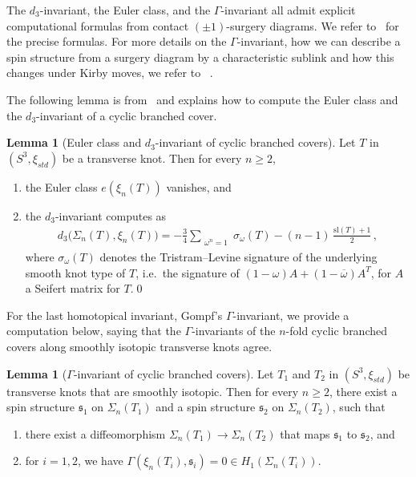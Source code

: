 \documentclass[11pt]{amsart}
\theoremstyle{definition}
\theoremstyle{definition}
\theoremstyle{definition}
\theoremstyle{definition}
\newtheorem{lemma}[theorem]{Lemma}
\begin{document}
The $d_3$-invariant, the Euler class, and the $\Gamma$-invariant all admit explicit computational formulas from contact $(\pm 1)$-surgery diagrams. We refer to~\cite{DingGeigesStipsicz_surgery,Durst_Kegel_rot_surgery,Kegel_thesis,EKS_contact_surgery_numbers} for the precise formulas. For more details on the $\Gamma$-invariant, how we can describe a spin structure from a surgery diagram by a characteristic sublink and how this changes under Kirby moves, we refer to ~\cite{Kaplan,Gompf_Stein,Gompf_Stipsicz,EKS_contact_surgery_numbers,surgery_distance}.

The following lemma is from~\cite{Plamenevskaya_DBC,Harvey_br_covers,Ito_d3} and explains how to compute the Euler class and the $d_3$-invariant of a cyclic branched cover. 

\begin{lemma}[Euler class and $d_3$-invariant of cyclic branched covers]\label{lem:d3}
    Let $T$ in $(S^3,\xi_{std})$ be a transverse knot. Then for every $n\geq2$, 
    \begin{enumerate}
        \item the Euler class $e(\xi_n(T))$ vanishes, and
        \item the $d_3$-invariant computes as
        \begin{align*} d_3\big(\Sigma_n(T),\xi_n(T)\big)=- \frac{3}{4} \sum_{\substack{\omega^n = 1}} \sigma_\omega(T)
- (n-1)\,\frac{\mathrm{sl}(T)+1}{2}\, ,
    \end{align*}
where $\sigma_\omega(T)$ denotes the Tristram--Levine signature of the underlying smooth knot type of $T$, i.e.\ the signature of $(1-\omega)A + (1-\overline{\omega})A^{T}$, for $A$ a Seifert matrix for $T$.\qed
\end{enumerate}
\end{lemma}

For the last homotopical invariant, Gompf's $\Gamma$-invariant, we provide a computation below, saying that the $\Gamma$-invariants of the $n$-fold cyclic branched covers along smoothly isotopic transverse knots agree.

\begin{lemma}[$\Gamma$-invariant of cyclic branched covers]\label{lem:Gamma}
    Let $T_1$ and $T_2$ in $(S^3,\xi_{std})$ be transverse knots that are smoothly isotopic. Then for every $n\geq2$, there exist a spin structure $\mathfrak{s_1}$ on $\Sigma_n(T_1)$ and a spin structure $\mathfrak{s_2}$ on $\Sigma_n(T_2)$, such that
    \begin{enumerate}
        \item there exist a diffeomorphism $\Sigma_n(T_1)\rightarrow \Sigma_n(T_2)$ that maps $\mathfrak{s}_1$ to $\mathfrak{s}_2$, and 
        \item for $i=1,2$, we have $\Gamma(\xi_n(T_i),\mathfrak{s}_i)=0\in H_1(\Sigma_n(T_i))$.
\end{enumerate}
\end{lemma}
\end{document}

